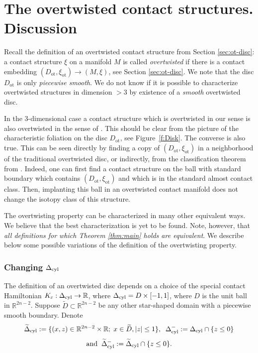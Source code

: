 \documentclass[12pt]{paper}
\theoremstyle{plain}
\theoremstyle{definition}
\newcommand{\wt}{\widetilde}
\newcommand{\eps}{\varepsilon}
\newcommand{\R}{{\mathbb{R}}}
\newcommand{\cyl}{{\rm cyl}}
\newcommand{\ot}{\mathrm{ot}}
\numberwithin{figure}{section}
\begin{document}




 
 \section{The overtwisted contact structures. Discussion}\label{sec:discussion}
 Recall the definition of an overtwisted contact structure from Section \ref{sec:ot-disc}:
 a contact structure $\xi$ on a manifold $M$ is called {\em overtwisted} if there is a contact embedding $(D_\ot,\xi_\ot)\to (M,\xi)$, see Section 
\ref{sec:ot-disc}. We note that the disc $D_\ot$ is only {\em piecewise smooth}.  We do not know if it is possible to characterize   overtwisted structures in dimension $>3$ by existence of a {\em smooth} overtwisted disc.  

In the $3$-dimensional case a contact structure which is overtwisted in our sense is also overtwisted in the  sense of \cite{Eli89}. This should be clear from the picture of the characteristic foliation on the disc $D_\ot$, see Figure~\ref{f:Disk}. 
The converse is also true. This can be seen directly by finding a copy of $(D_\ot,\xi_\ot)$ in a neighborhood of the traditional overtwisted disc, or indirectly, from the classification theorem from \cite{Eli89}.
Indeed,   one can first find a contact structure on the ball with standard boundary which contains $(D_\ot,\xi_\ot)$ and which is  in the standard almost contact class. Then, implanting this ball in an overtwisted contact manifold does not change the isotopy class of this structure.

The overtwisting property can be characterized in many other equivalent ways. We believe that the best characterization is yet to be found. Note, however, that {\em all  definitions  for which Theorem \ref{thm:main} holds are equivalent}. We describe below some possible  variations of the definition of the overtwisting property.

 
\subsubsection*{Changing $\Delta_\cyl$}
The definition of an overtwisted disc depends on a choice of the special contact Hamiltonian $K_\eps:\Delta_\cyl\to \R$, where $\Delta_\cyl=D\times[-1,1]$, where $D$ is the unit ball in $\R^{2n-2}$. 
Suppose $\wt D\subset\R^{2n-2}$ be any other star-shaped domain   with a piecewise smooth boundary. Denote
$$\wt\Delta_\cyl:= \{(x,z)\in\R^{2n-2}\times\R;\; x\in\wt D, |z|\leq 1\},\;\;
 \Delta_\cyl^-:=\Delta_\cyl\cap\{z\leq 0\} $$
 $$\hbox{and}\;\; \wt\Delta_\cyl^-:=\wt\Delta_\cyl\cap\{z\leq 0\}.$$ 
\end{document}
